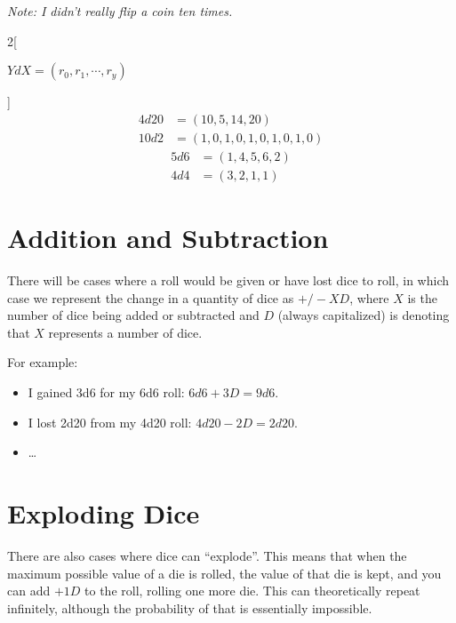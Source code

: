 \documentclass[../main.tex]{subfiles}
\begin{document}
    \emph{Note: I didn't really flip a coin ten times.}
    \begin{mdframed}[style=Arrata]
        \begin{multicols}{2}[
                \begin{center}
                    $YdX = (r_{0},r_{1},\cdots,r_{y})$
                \end{center}
            ] \noindent 
            \begin{align*}
                4d20 & = (10, 5, 14, 20)                \\
                10d2 & = (1, 0, 1, 0, 1, 0, 1, 0, 1, 0) 
            \end{align*}
            \columnbreak
            \begin{align*}
                5d6 & = (1, 4, 5, 6, 2)                 \\
                4d4 & = (3, 2, 1, 1) 
            \end{align*}
        \end{multicols}
    \end{mdframed}

    \section{Addition and Subtraction}

    There will be cases where a roll would be given or have lost dice to roll, in which case we represent the change in a quantity of dice as $+/-XD$, where $X$ is the number of dice being added or subtracted and $D$ (always capitalized) is denoting that $X$ represents a number of dice.

    For example:
    \begin{itemize}
        \item I gained 3d6 for my 6d6 roll: $6d6 + 3D = 9d6$.
        \item I lost 2d20 from my 4d20 roll: $4d20 - 2D = 2d20$.
        \item \dots
    \end{itemize}

    \section{Exploding Dice}

    There are also cases where dice can ``explode''. This means that when the maximum possible value of a die is rolled, the value of that die is kept, and you can add $+1D$ to the roll, rolling one more die. This can theoretically repeat infinitely, although the probability of that is essentially impossible.
\end{document}
